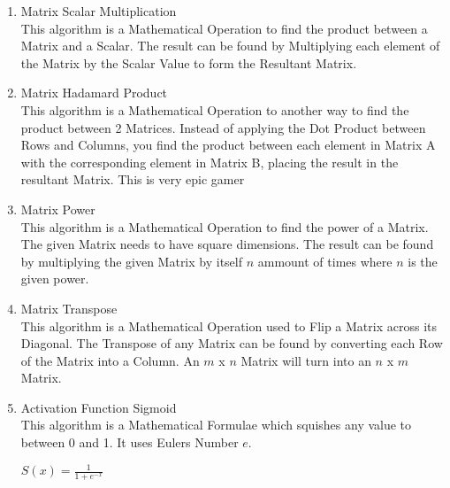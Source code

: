 \begin{flushleft}
\begin{enumerate}
\begin{enumerate}[label=\arabic*)]
                \vspace{0.5cm}
                \item Matrix Scalar Multiplication \\
                This algorithm is a Mathematical Operation to find the product between a Matrix and a Scalar.
                The result can be found by Multiplying each element of the Matrix by the Scalar Value to form the Resultant 
                Matrix.
                
                \vspace{0.5cm}
                \item Matrix Hadamard Product \\
                This algorithm is a Mathematical Operation to another way to find the product between 2 Matrices. Instead of
                applying the Dot Product between Rows and Columns, you find the product between each element in Matrix A
                with the corresponding element in Matrix B, placing the result in the resultant Matrix. This is very epic gamer

                \vspace{0.5cm}
                \item Matrix Power \\
                This algorithm is a Mathematical Operation to find the power of a Matrix. The given Matrix needs to have square dimensions.
                The result can be found by multiplying the given Matrix by itself $n$ ammount of times where $n$ is the given power.
                
                \vspace{0.5cm}
                \item Matrix Transpose \\
                This algorithm is a Mathematical Operation used to Flip a Matrix across its Diagonal. The Transpose of any Matrix
                can be found by converting each Row of the Matrix into a Column. An $m$ x $n$ Matrix will turn into an $n$ x $m$ Matrix.
                
                \vspace{0.5cm}
                \item Activation Function Sigmoid \\
                This algorithm is a Mathematical Formulae which squishes any value to between 0 and 1. It uses Eulers Number $e$.

                \vspace{0.2cm}
                {\Large\centerline{$S(x) = \frac{1}{1 + e^{-x}}$}}
                \vspace{0.2cm}
                

\end{enumerate}
\end{enumerate}
\end{flushleft}
